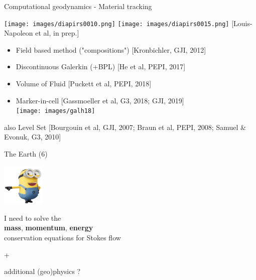 \documentclass[handout]{beamer}
\begin{document}
\begin{frame}[plain]{Computational geodynamics - Material tracking}

\begin{center}
\texttt{[image: images/diapirs0010.png]}
\texttt{[image: images/diapirs0015.png]} {\tiny [Louis-Napoleon et al, in prep.]}
\end{center}

\pause

\begin{itemize}
\item
Field based method ("compositions") {\tiny [Kronbichler, GJI, 2012]}

\item
Discontinuous Galerkin (+BPL) {\tiny [He et al, PEPI, 2017]}

\item
Volume of Fluid {\tiny [Puckett et al, PEPI, 2018]}

\item
Marker-in-cell {\tiny [Gassmoeller et al, G3, 2018; GJI, 2019]}\\
\texttt{[image: images/galh18]}
\end{itemize}

\pause
also Level Set {\tiny [Bourgouin et al, GJI, 2007; Braun et al, PEPI, 2008; Samuel \& Evonuk, G3, 2010]}
\end{frame}


\begin{frame}[plain]{The Earth (6)}

\begin{center}
\includegraphics[height=2cm]{images/minion}

I need to solve the\\
{\bf mass}, {\bf momentum}, {\bf energy}\\
conservation equations for Stokes flow

+

additional (geo)physics ?

\end{center}


\end{frame}
\end{document}
